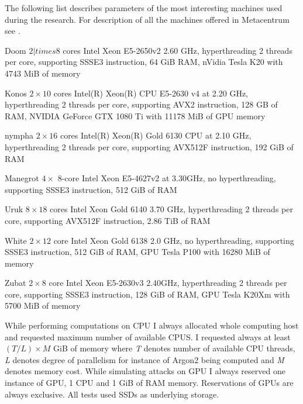 \documentclass[nolof]{fithesis3}
\begin{document}
The following list describes parameters of the most interesting machines used during the research. For description of all the machines offered in Metacentrum see \parencite{metacentrumhw}.

\begin{description}
\item{Doom} $2 |times 8$ cores Intel Xeon E5-2650v2 2.60 GHz, hyperthreading 2 threads per core, supporting SSSE3 instruction, 64 GiB RAM, nVidia Tesla K20 with 4743 MiB of memory

\item{Konos} $2\times10$ cores Intel(R) Xeon(R) CPU E5-2630 v4 at 2.20 GHz, hyperthreading 2 threads per core, supporting AVX2 instruction, 128 GB of RAM, NVIDIA GeForce GTX 1080 Ti with 11178 MiB of GPU memory

\item{nympha} $2\times16$ cores Intel(R) Xeon(R) Gold 6130 CPU at 2.10 GHz, hyperthreading 2 threads per core, supporting AVX512F instruction, 192 GiB of RAM

\item{Manegrot} $4\times$ 8-core Intel Xeon E5-4627v2 at 3.30GHz, no hyperthreading, supporting SSSE3 instruction, 512 GiB of RAM

\item{Uruk} $8\times18$ cores Intel Xeon Gold 6140  3.70 GHz, hyperthreading 2 threads per core, supporting AVX512F instruction, 2.86 TiB of RAM

\item{White} $2\times12$ core Intel Xeon Gold 6138 2.0 GHz, no hyperthreading, supporting SSSE3 instruction, 512 GiB of RAM, GPU Tesla P100 with 16280 MiB of memory

\item{Zubat} $2\times8$ core Intel Xeon E5-2630v3 2.40GHz, hyperthreading 2 threads per core, supporting SSSE3 instruction, 128 GiB of RAM, GPU Tesla K20Xm with 5700 MiB of memory
\end{description}

While performing computations on CPU I always allocated whole computing host and requested maximum number of available CPUS. I requested always at least $(T/L) \times M$ GiB of memory where \emph{T} denotes number of available CPU threads, \emph{L} denotes degree of parallelism for instance of Argon2 being computed and \emph{M} denotes memory cost. While simulating attacks on GPU I always reserved one instance of GPU, 1 CPU and 1 GiB of RAM memory. Reservations of GPUs are always exclusive. All tests used SSDs as underlying storage.
\end{document}
